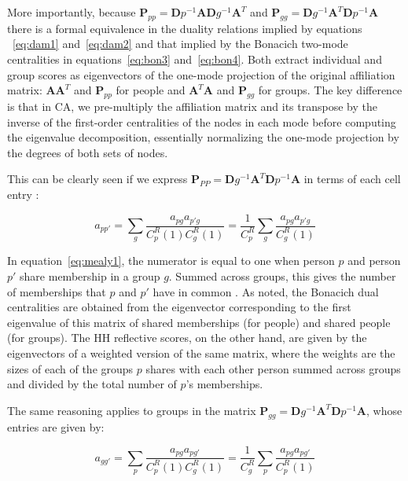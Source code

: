\documentclass[a4paper,fleqn]{cas-sc}
\begin{document}
More importantly, because $\mathbf{P}_{pp} = \mathbf{D}p^{-1}\mathbf{A}\mathbf{D}g^{-1}\mathbf{A}^T$ and $\mathbf{P}_{gg} = \mathbf{D}g^{-1}\mathbf{A}^T\mathbf{D}p^{-1}\mathbf{A}$ there is a formal equivalence in the duality relations implied by equations ~\ref{eq:dam1} and~\ref{eq:dam2} and that implied by the Bonacich two-mode centralities in equations~\ref{eq:bon3} and~\ref{eq:bon4}. Both extract individual and group scores as eigenvectors of the one-mode projection of the original affiliation matrix: $\mathbf{AA}^T$ and $\mathbf{P}_{pp}$ for people and $\mathbf{A}^T\mathbf{A}$ and $\mathbf{P}_{gg}$ for groups. The key difference is that in CA, we pre-multiply the affiliation matrix and its transpose by the inverse of the first-order centralities of the nodes in each mode before computing the eigenvalue decomposition, essentially normalizing the one-mode projection by the degrees of both sets of nodes. 

This can be clearly seen if we express $\mathbf{P}_{PP}= \mathbf{D}g^{-1}\mathbf{A}^T\mathbf{D}p^{-1}\mathbf{A}$ in terms of each cell entry \cite[eq. 4]{mealy2019interpreting}:

\begin{equation}
    a_{pp'} = \sum_g\frac{a_{pg}a_{p'g}}{C^R_p(1)C^R_g(1)} = 
    \frac{1}{C^R_p}\sum_g\frac{a_{pg}a_{p'g}}{C^R_g(1)}
    \label{eq:mealy1}
\end{equation}

In equation~\ref{eq:mealy1}, the numerator is equal to one when person $p$ and person $p'$ share membership in a group $g$. Summed across groups, this gives the number of memberships that $p$ and $p'$ have in common \citep{breiger1974duality}. As noted, the Bonacich dual centralities are obtained from the eigenvector corresponding to the first eigenvalue of this matrix of shared memberships (for people) and shared people (for groups). The HH reflective scores, on the other hand, are given by the eigenvectors of a weighted version of the same matrix, where the weights are the sizes of each of the groups $p$ shares with each other person summed across groups and divided by the total number of $p$'s memberships. 

The same reasoning applies to groups in the matrix $\mathbf{P}_{gg} = \mathbf{D}g^{-1}\mathbf{A}^T\mathbf{D}p^{-1}\mathbf{A}$, whose entries are given by:

\begin{equation}
    a_{gg'} = \sum_p\frac{a_{pg}a_{pg'}}{C^R_p(1)C^R_g(1)} = 
    \frac{1}{C^R_g}\sum_p\frac{a_{pg}a_{pg'}}{C^R_p(1)}
    \label{eq:mealy2}
\end{equation}
\end{document}
